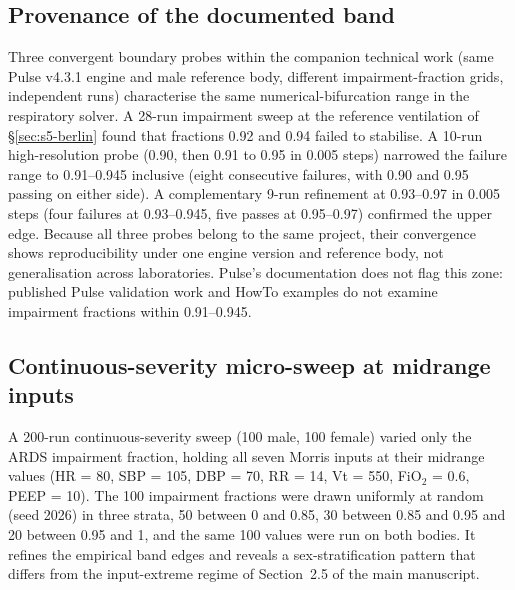 \documentclass[pdflatex,sn-nature]{sn-jnl}%
\newcommand{\mainref}[2]{#2}
\begin{document}
\subsection{Provenance of the documented band}\label{sec:s5-prov}

Three convergent boundary probes within the companion technical work (same Pulse v4.3.1 engine and male reference body, different impairment-fraction grids, independent runs) characterise the same numerical-bifurcation range in the respiratory solver. A 28-run impairment sweep at the reference ventilation of \S\ref{sec:s5-berlin} found that fractions 0.92 and 0.94 failed to stabilise. A 10-run high-resolution probe (0.90, then 0.91 to 0.95 in 0.005 steps) narrowed the failure range to 0.91--0.945 inclusive (eight consecutive failures, with 0.90 and 0.95 passing on either side). A complementary 9-run refinement at 0.93--0.97 in 0.005 steps (four failures at 0.93--0.945, five passes at 0.95--0.97) confirmed the upper edge. Because all three probes belong to the same project, their convergence shows reproducibility under one engine version and reference body, not generalisation across laboratories. Pulse's documentation does not flag this zone: published Pulse validation work and HowTo examples do not examine impairment fractions within 0.91--0.945.

\subsection{Continuous-severity micro-sweep at midrange inputs}\label{sec:s5-cont}

A 200-run continuous-severity sweep (100 male, 100 female) varied only the ARDS impairment fraction, holding all seven Morris inputs at their midrange values (HR = 80, SBP = 105, DBP = 70, RR = 14, Vt = 550, FiO$_2$ = 0.6, PEEP = 10). The 100 impairment fractions were drawn uniformly at random (seed 2026) in three strata, 50 between 0 and 0.85, 30 between 0.85 and 0.95 and 20 between 0.95 and 1, and the same 100 values were run on both bodies. It refines the empirical band edges and reveals a sex-stratification pattern that differs from the input-extreme regime of Section~\mainref{sec:results-sex}{2.5} of the main manuscript.
\end{document}
